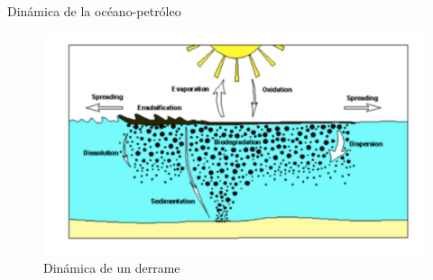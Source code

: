 \begin{frame}{Dinámica de la océano-petróleo}
    \begin{figure}
        \centering
        \includegraphics[scale=0.2]{img/section_01/dinamica-derrame.png}
        \caption{Dinámica de un derrame}
        \label{fig:section_01_dinamica_derrame}
    \end{figure}    
\end{frame}
